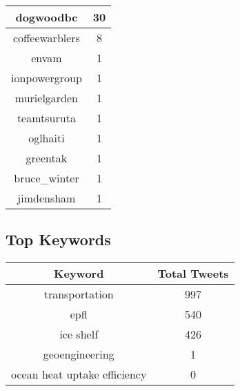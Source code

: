 \documentclass{article}\usepackage[T1]{fontenc}
\begin{document}
\begin{tabular}{|c|c|}
 \hline
dogwoodbc & 30\\ 
 \hline
coffeewarblers & 8\\ 
 \hline
envam & 1\\ 
 \hline
ionpowergroup & 1\\ 
 \hline
murielgarden & 1\\ 
 \hline
teamtsuruta & 1\\ 
 \hline
oglhaiti & 1\\ 
 \hline
greentak & 1\\ 
 \hline
bruce\_winter & 1\\ 
 \hline
jimdensham & 1\\ 
 \hline
\end{tabular}\subsection*{Top Keywords}\begin{tabular}{|c|c|}         \hline         Keyword & Total Tweets \\ 
 \hline
transportation & 997\\ 
 \hline
epfl & 540\\ 
 \hline
ice shelf & 426\\ 
 \hline
geoengineering & 1\\ 
 \hline
ocean heat uptake efficiency & 0\\ 
 \hline
\end{tabular}
\end{document}
